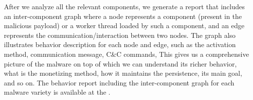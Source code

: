 
\pagebreak

After we analyze all the relevant components, we generate a report that
includes an inter-component graph where a node represents a component 
(present in the malicious payload) or a worker thread loaded by such a component, and an edge represents 
the communication/interaction between two nodes. 
The graph also illustrates behavior description for each node and edge, such as
the activation method, communication message, C\&C commands, \etc
This gives us a comprehensive picture of the malware on top of which  
we can understand its richer behavior, \eg what is the monetizing method,
how it maintains the persistence, its main goal, and so on.
The behavior report including the inter-component graph for each malware variety is 
available at the \amd.

